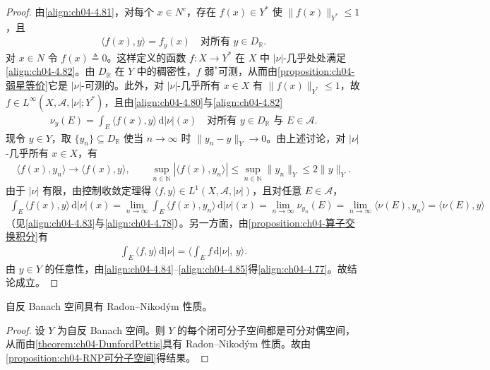 \documentclass[../../main.tex]{subfiles}%
\begin{document}
\begin{proof}
由\eqref{align:ch04-4.81}，对每个 $x\in N^c$，存在 $f(x)\in Y^*$ 使 $\|f(x)\|_{Y^*}\leqslant1$，且
\begin{align}
\langle f(x),y\rangle=f_y(x)\quad\text{对所有 }y\in D_{\mathbb R}. \label{align:ch04-4.82}
\end{align}
对 $x\in N$ 令 $f(x)\triangleq 0$。这样定义的函数 $f:X\to Y^*$ 在 $X$ 中 $|\nu|$-几乎处处满足\eqref{align:ch04-4.82}。由 $D_{\mathbb R}$ 在 $Y$ 中的稠密性，$f$ 弱$^*$可测，从而由\cref{proposition:ch04-弱星等价}它是 $|\nu|$-可测的。此外，对 $|\nu|$-几乎所有 $x\in X$ 有 $\|f(x)\|_{Y^*}\leqslant1$，故 $f\in L^\infty(X,\mathcal{A},|\nu|;Y^*)$，且由\eqref{align:ch04-4.80}与\eqref{align:ch04-4.82}
\begin{align}
\nu_y(E)=\int_E\langle f(x),y\rangle\,\mathrm{d}|\nu|(x)\quad\text{对所有 }y\in D_{\mathbb R}\text{ 与 }E\in\mathcal{A}. \label{align:ch04-4.83}
\end{align}
现令 $y\in Y$，取 $\{y_n\}\subseteq D_{\mathbb R}$ 使当 $n\to\infty$ 时 $\|y_n-y\|_Y\to0$。由上述讨论，对 $|\nu|$-几乎所有 $x\in X$，有
\begin{align*}
\langle f(x),y_n\rangle\to\langle f(x),y\rangle,\qquad \sup_{n\in\mathbb N}|\langle f(x),y_n\rangle|\leqslant\sup_{n\in\mathbb N}\|y_n\|_Y\leqslant2\|y\|_Y.
\end{align*}
由于 $|\nu|$ 有限，由控制收敛定理得 $\langle f,y\rangle\in L^1(X,\mathcal{A},|\nu|)$，且对任意 $E\in\mathcal{A}$，
\begin{align}
\int_E\langle f(x),y\rangle\,\mathrm{d}|\nu|(x)=\lim_{n\to\infty}\int_E\langle f(x),y_n\rangle\,\mathrm{d}|\nu|(x)
=\lim_{n\to\infty}\nu_{y_n}(E)=\lim_{n\to\infty}\langle\nu(E),y_n\rangle=\langle\nu(E),y\rangle \label{align:ch04-4.84}
\end{align}
（见\eqref{align:ch04-4.83}与\eqref{align:ch04-4.78}）。另一方面，由\cref{proposition:ch04-算子交换积分}有
\begin{align}
\int_E\langle f,y\rangle\,\mathrm{d}|\nu|=\Big\langle\int_E f\,\mathrm{d}|\nu|,\,y\Big\rangle. \label{align:ch04-4.85}
\end{align}
由 $y\in Y$ 的任意性，由\eqref{align:ch04-4.84}--\eqref{align:ch04-4.85}得\eqref{align:ch04-4.77}。故结论成立。
\end{proof}

\begin{corollary}[Phillips]\label{corollary:ch04-自反RNP}
自反 Banach 空间具有 Radon--Nikodým 性质。
\end{corollary}

\begin{proof}
设 $Y$ 为自反 Banach 空间。则 $Y$ 的每个闭可分子空间都是可分对偶空间，从而由\cref{theorem:ch04-DunfordPettis}具有 Radon--Nikodým 性质。故由\cref{proposition:ch04-RNP可分子空间}得结果。
\end{proof}
\end{document}
